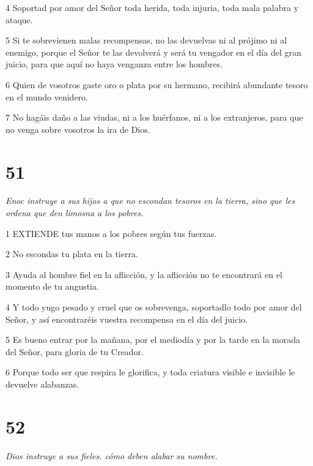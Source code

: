 \par 4 Soportad por amor del Señor toda herida, toda injuria, toda mala palabra y ataque.

\par 5 Si te sobrevienen malas recompensas, no las devuelvas ni al prójimo ni al enemigo, porque el Señor te las devolverá y será tu vengador en el día del gran juicio, para que aquí no haya venganza entre los hombres.

\par 6 Quien de vosotros gaste oro o plata por su hermano, recibirá abundante tesoro en el mundo venidero.

\par 7 No hagáis daño a las viudas, ni a los huérfanos, ni a los extranjeros, para que no venga sobre vosotros la ira de Dios.

\chapter{51}

\par \textit{Enoc instruye a sus hijos a que no escondan tesoros en la tierra, sino que les ordena que den limosna a los pobres.}

\par 1 EXTIENDE tus manos a los pobres según tus fuerzas.

\par 2 No escondas tu plata en la tierra.

\par 3 Ayuda al hombre fiel en la aflicción, y la aflicción no te encontrará en el momento de tu angustia.

\par 4 Y todo yugo pesado y cruel que os sobrevenga, soportadlo todo por amor del Señor, y así encontraréis vuestra recompensa en el día del juicio.

\par 5 Es bueno entrar por la mañana, por el mediodía y por la tarde en la morada del Señor, para gloria de tu Creador.

\par 6 Porque todo ser que respira le glorifica, y toda criatura visible e invisible le devuelve alabanzas.

\chapter{52}

\par \textit{Dios instruye a sus fieles. cómo deben alabar su nombre.}

